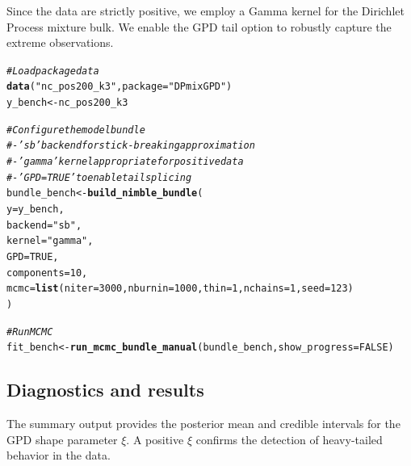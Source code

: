 \documentclass[article]{jss}\usepackage[]{graphicx}\usepackage[]{xcolor}
\makeatletter
\newcommand{\hlnum}[1]{\textcolor[rgb]{0.686,0.059,0.569}{#1}}%
\newcommand{\hlsng}[1]{\textcolor[rgb]{0.192,0.494,0.8}{#1}}%
\newcommand{\hlcom}[1]{\textcolor[rgb]{0.678,0.584,0.686}{\textit{#1}}}%
\newcommand{\hldef}[1]{\textcolor[rgb]{0.345,0.345,0.345}{#1}}%
\newcommand{\hlkwb}[1]{\textcolor[rgb]{0.69,0.353,0.396}{#1}}%
\newcommand{\hlkwc}[1]{\textcolor[rgb]{0.333,0.667,0.333}{#1}}%
\newcommand{\hlkwd}[1]{\textcolor[rgb]{0.737,0.353,0.396}{\textbf{#1}}}%
\newenvironment{kframe}{%
 \def\at@end@of@kframe{}%
 \ifinner\ifhmode%
  \def\at@end@of@kframe{\end{minipage}}%
  \begin{minipage}{\columnwidth}%
 \fi\fi%
 \def\FrameCommand##1{\hskip\@totalleftmargin \hskip-\fboxsep
 \colorbox{shadecolor}{##1}\hskip-\fboxsep
     \hskip-\linewidth \hskip-\@totalleftmargin \hskip\columnwidth}%
 \MakeFramed {\advance\hsize-\width
   \@totalleftmargin\z@ \linewidth\hsize
   \@setminipage}}%
 {\par\unskip\endMakeFramed%
 \at@end@of@kframe}
\newenvironment{knitrout}{}{} %
\makeatother
\begin{document}
Since the data are strictly positive, we employ a Gamma kernel for the Dirichlet Process mixture bulk. We enable the GPD tail option to robustly capture the extreme observations.

\begin{knitrout}
\color{fgcolor}\begin{kframe}
\begin{alltt}
\hlcom{# Load package data}
\hlkwd{data}\hldef{(}\hlsng{"nc_pos200_k3"}\hldef{,} \hlkwc{package} \hldef{=} \hlsng{"DPmixGPD"}\hldef{)}
\hldef{y_bench} \hlkwb{<-} \hldef{nc_pos200_k3}

\hlcom{# Configure the model bundle}
\hlcom{# - 'sb' backend for stick-breaking approximation}
\hlcom{# - 'gamma' kernel appropriate for positive data}
\hlcom{# - 'GPD = TRUE' to enable tail splicing}
\hldef{bundle_bench} \hlkwb{<-} \hlkwd{build_nimble_bundle}\hldef{(}
  \hlkwc{y} \hldef{= y_bench,}
  \hlkwc{backend} \hldef{=} \hlsng{"sb"}\hldef{,}
  \hlkwc{kernel} \hldef{=} \hlsng{"gamma"}\hldef{,}
  \hlkwc{GPD} \hldef{=} \hlnum{TRUE}\hldef{,}
  \hlkwc{components} \hldef{=} \hlnum{10}\hldef{,}
  \hlkwc{mcmc} \hldef{=} \hlkwd{list}\hldef{(}\hlkwc{niter} \hldef{=} \hlnum{3000}\hldef{,} \hlkwc{nburnin} \hldef{=} \hlnum{1000}\hldef{,} \hlkwc{thin} \hldef{=} \hlnum{1}\hldef{,} \hlkwc{nchains} \hldef{=} \hlnum{1}\hldef{,} \hlkwc{seed} \hldef{=} \hlnum{123}\hldef{)}
\hldef{)}
\end{alltt}


{\ttfamily\noindent\bfseries\color{errorcolor}{\#\# Error in `build\_nimble\_bundle()`:\\\#\# ! 'list' object cannot be coerced to type 'double'}}\begin{alltt}
\hlcom{# Run MCMC}
\hldef{fit_bench} \hlkwb{<-} \hlkwd{run_mcmc_bundle_manual}\hldef{(bundle_bench,} \hlkwc{show_progress} \hldef{=} \hlnum{FALSE}\hldef{)}
\end{alltt}


{\ttfamily\noindent\bfseries\color{errorcolor}{\#\# Error:\\\#\# ! object 'bundle\_bench' not found}}\end{kframe}
\end{knitrout}

\subsection{Diagnostics and results}

The summary output provides the posterior mean and credible intervals for the GPD shape parameter $\xi$. A positive $\xi$ confirms the detection of heavy-tailed behavior in the data.
\end{document}
